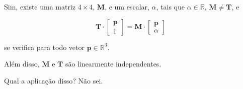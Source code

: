 \documentclass[a4paper]{article}
\begin{document}
Sim, existe uma matriz $4 \times 4$, $\mathbf{M}$, e um escalar, $\alpha$, tais que $\alpha \in \mathbb{R}$, $\mathbf{M} \neq \mathbf{T}$, e

\begin{equation}
    \mathbf{T}\cdot\begin{bmatrix}\mathbf{p} \\ 1\end{bmatrix} = \mathbf{M}\cdot\begin{bmatrix}\mathbf{p} \\ \alpha\end{bmatrix}
\end{equation}

se verifica para todo vetor $\mathbf{p} \in \mathbb{R}^3$.

Além disso, $\mathbf{M}$ e $\mathbf{T}$ são linearmente independentes.

Qual a aplicação disso? Não sei.
\end{document}
